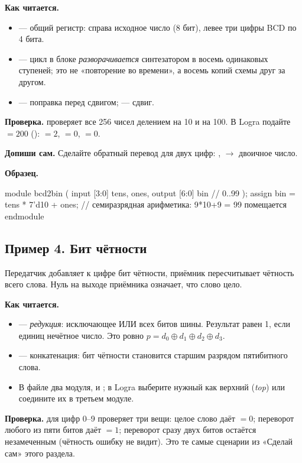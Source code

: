 \textbf{Как читается.}
\begin{itemize}
  \item {} --- общий регистр: справа исходное число (8 бит), левее три цифры BCD по 4 бита.
  \item {} --- цикл в блоке  \emph{разворачивается} синтезатором в восемь одинаковых ступеней; это не «повторение во времени», а восемь копий схемы друг за другом.
  \item {} --- поправка перед сдвигом;  --- сдвиг.
\end{itemize}
\textbf{Проверка.}  проверяет все 256 чисел делением на 10 и
на 100. В Logra подайте $=200$ (): $=2$,
$=0$, $=0$.

\textbf{Допиши сам.} Сделайте обратный перевод для двух цифр: ,
 $\to$ двоичное число.

\textbf{Образец.}\par\nopagebreak
\begin{vcode}
module bcd2bin (
    input  [3:0] tens, ones,
    output [6:0] bin          // 0..99
);
    assign bin = tens * 7'd10 + ones;   // семиразрядная арифметика: 9*10+9 = 99 помещается
endmodule
\end{vcode}

\subsection{Пример 4. Бит чётности}

Передатчик добавляет к цифре бит чётности, приёмник пересчитывает чётность всего
слова. Нуль на выходе приёмника означает, что слово цело.


\textbf{Как читается.}
\begin{itemize}
  \item {} --- \emph{редукция}: исключающее ИЛИ всех битов шины. Результат равен 1, если единиц нечётное число. Это ровно $p=d_0\oplus d_1\oplus d_2\oplus d_3$.
  \item {} --- конкатенация: бит чётности становится старшим разрядом пятибитного слова.
  \item В файле два модуля,  и ; в Logra выберите нужный как верхний (\emph{top}) или соедините их в третьем модуле.
\end{itemize}
\textbf{Проверка.}  для цифр 0--9 проверяет три вещи: целое
слово даёт $=0$; переворот любого из пяти битов даёт $=1$;
переворот сразу двух битов остаётся незамеченным (чётность ошибку не видит). Это
те самые сценарии из «Сделай сам» этого раздела.

